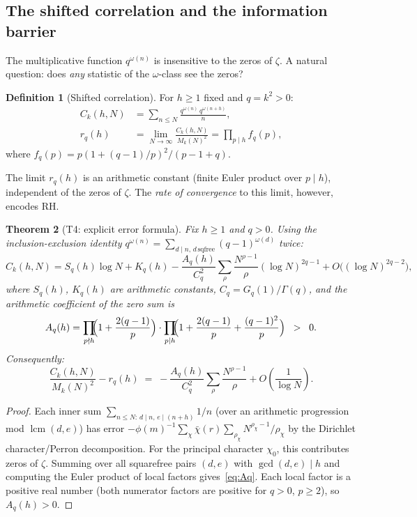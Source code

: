 \documentclass[11pt]{amsart}
\newtheorem{theorem}{Theorem}[section]
\theoremstyle{definition}
\newtheorem{definition}[theorem]{Definition}
\theoremstyle{remark}
\newcommand{\om}{\omega}
\begin{document}
\subsection{The shifted correlation and the information barrier}
\label{ss:correlation}

The multiplicative function $q^{\om(n)}$ is insensitive to the zeros of $\zeta$.
A natural question: does \emph{any} statistic of the $\om$-class see the zeros?

\begin{definition}[Shifted correlation]
For $h \ge 1$ fixed and $q = k^2 > 0$:
\begin{align}
  C_k(h,N) &= \sum_{n\le N}\frac{q^{\om(n)}\,q^{\om(n+h)}}{n}, \\
  r_q(h) &= \lim_{N\to\infty}\frac{C_k(h,N)}{M_k(N)^2}
           = \prod_{p\mid h} f_q(p),
\end{align}
where $f_q(p) = p(1+(q-1)/p)^2/(p-1+q)$.
\end{definition}

The limit $r_q(h)$ is an arithmetic constant (finite Euler product over $p\mid h$),
independent of the zeros of $\zeta$.  The \emph{rate of convergence} to this limit,
however, encodes RH.

\begin{theorem}[T4: explicit error formula]
\label{thm:T4}
Fix $h\ge 1$ and $q > 0$.  Using the inclusion-exclusion identity
$q^{\om(n)} = \sum_{d\mid n,\,d\,\mathrm{sqfree}}(q-1)^{\om(d)}$ twice:
\[
  C_k(h,N) = S_q(h)\log N + K_q(h)
  - \frac{A_q(h)}{C_q^2}\sum_\rho \frac{N^{\rho-1}}{\rho}(\log N)^{2q-1}
  + O\!\bigl((\log N)^{2q-2}\bigr),
\]
where $S_q(h)$, $K_q(h)$ are arithmetic constants, $C_q = G_q(1)/\Gamma(q)$,
and the arithmetic coefficient of the zero sum is
\begin{equation}
  \label{eq:Aq}
  A_q(h) = \prod_{p\nmid h}\!\!\Bigl(1+\frac{2(q-1)}{p}\Bigr)
            \cdot\prod_{p\mid h}\!\!\Bigl(1+\frac{2(q-1)}{p}+\frac{(q-1)^2}{p}\Bigr)
  \;\; > \;\; 0.
\end{equation}
Consequently:
\[
  \frac{C_k(h,N)}{M_k(N)^2} - r_q(h)
  \;=\; -\frac{A_q(h)}{C_q^2}\sum_\rho \frac{N^{\rho-1}}{\rho} + O\!\left(\frac{1}{\log N}\right).
\]
\end{theorem}

\begin{proof}
Each inner sum $\sum_{n\le N:\,d\mid n,\,e\mid(n+h)}1/n$ (over an arithmetic progression
mod $\operatorname{lcm}(d,e)$) has error $-\phi(m)^{-1}\sum_\chi\bar\chi(r)\sum_{\rho_\chi}
N^{\rho_\chi-1}/\rho_\chi$ by the Dirichlet character/Perron decomposition.  For the
principal character $\chi_0$, this contributes zeros of $\zeta$.  Summing over all
squarefree pairs $(d,e)$ with $\gcd(d,e)\mid h$ and computing the Euler product of
local factors gives~\eqref{eq:Aq}.  Each local factor is a positive real number
(both numerator factors are positive for $q>0$, $p\ge 2$), so $A_q(h)>0$.
\end{proof}
\end{document}
